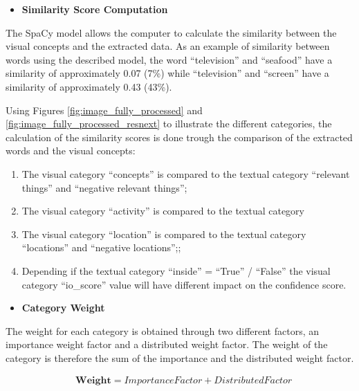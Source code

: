     

    \begin{itemize}
      \item \textbf{Similarity Score Computation}
    \end{itemize}

    The SpaCy model allows the computer to calculate the similarity between the visual concepts and the extracted data. As an example of similarity between words using the described model, the word \enquote{television} and \enquote{seafood} have a similarity of approximately 0.07 (7\%) while \enquote{television} and \enquote{screen} have a similarity of approximately 0.43 (43\%).
    
      
    Using Figures \ref{fig:image_fully_processed} and \ref{fig:image_fully_processed_resnext} to illustrate the different categories, the calculation of the similarity scores is done trough the comparison of the extracted words and the visual concepts:
    \begin{enumerate}
        \itemsep0em
        \item The visual category \enquote{concepts} is compared to the textual category \enquote{relevant things} and \enquote{negative relevant things};
        \item The visual category \enquote{activity} is compared to the textual category 
        \item The visual category \enquote{location} is compared to the textual category \enquote{locations} and \enquote{negative locations};;
        \item Depending if the textual category \enquote{inside} = \enquote{True} / \enquote{False} the visual category \enquote{io\_score} value will have different impact on the confidence score.
    \end{enumerate}

    \begin{itemize}
      \item \textbf{Category Weight}
    \end{itemize}


    The weight for each category is obtained through two different factors, an importance weight factor and a distributed weight factor. The weight of the category is therefore the sum of the importance and the distributed weight factor. 

    \begin{align*}
      &\textbf{Weight}  =   ImportanceFactor + DistributedFactor \\ 
  \end{align*}

